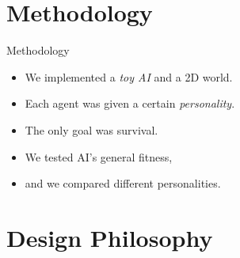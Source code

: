 \documentclass{beamer}
\begin{document}
%      
%      
%      
%

   \section{Methodology}
   
   \begin{frame}{Methodology}
      \begin{itemize}
         \item We implemented a \emph{toy AI} and a 2D world.
         \item Each agent was given a certain \emph{personality}.
         \item The only goal was survival.
         
         \vspace{1cm}
         
         \item We tested AI's general fitness,
         \item and we compared different personalities.
      \end{itemize}
   \end{frame}
   
   \section{Design Philosophy}
   
\end{document}
